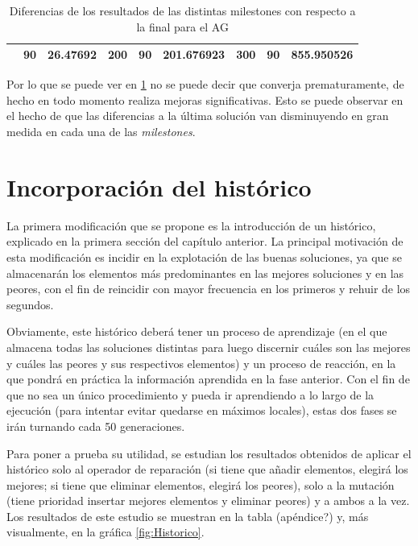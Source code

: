 \begin{table}[]
\begin{tabular}{|cclcclccl|}
\rowcolor[HTML]{DAE8FC} 
\multicolumn{1}{|c|}{\multirow{-13}{*}{\cellcolor[HTML]{FFFFC7}100}} & \multicolumn{1}{c|}{\cellcolor[HTML]{DAE8FC}90}        & \multicolumn{1}{l|}{\cellcolor[HTML]{DAE8FC}26.47692}   & \multicolumn{1}{c|}{\multirow{-13}{*}{\cellcolor[HTML]{FFFFC7}200}} & \multicolumn{1}{c|}{\cellcolor[HTML]{DAE8FC}90}        & \multicolumn{1}{l|}{\cellcolor[HTML]{DAE8FC}201.676923} & \multicolumn{1}{c|}{\multirow{-13}{*}{\cellcolor[HTML]{FFFFC7}300}} & \multicolumn{1}{c|}{\cellcolor[HTML]{DAE8FC}90}        & 855.950526 \\ \hline
\end{tabular}
\caption{\label{diferenciasAGEU}Diferencias de los resultados de las distintas milestones con respecto a la final para el AG}
\end{table}

Por lo que se puede ver en \ref{diferenciasAGEU} no se puede decir que converja prematuramente, de hecho en todo momento realiza mejoras significativas. 
Esto se puede observar en el hecho de que las diferencias a la última solución van disminuyendo en gran medida en cada una de las \textit{milestones}. 

\section{Incorporación del histórico}

La primera modificación que se propone es la introducción de un histórico, explicado en la primera sección del capítulo anterior. 
La principal motivación de esta modificación es incidir en la explotación de las buenas soluciones, ya que se almacenarán los elementos más predominantes en las mejores soluciones y en las peores, con el fin de reincidir con mayor frecuencia en los primeros y rehuir de los segundos. 

Obviamente, este histórico deberá tener un proceso de aprendizaje (en el que almacena todas las soluciones distintas para luego discernir cuáles son las mejores y cuáles las peores y sus respectivos elementos) y un proceso de reacción, en la que pondrá en práctica la información aprendida en la fase anterior. 
Con el fin de que no sea un único procedimiento y pueda ir aprendiendo a lo largo de la ejecución (para intentar evitar quedarse en máximos locales), estas dos fases se irán turnando cada 50 generaciones. 

Para poner a prueba su utilidad, se estudian los resultados obtenidos de aplicar el histórico solo al operador de reparación (si tiene que añadir elementos, elegirá los mejores; si tiene que eliminar elementos, elegirá los peores), solo a la mutación (tiene prioridad insertar mejores elementos y eliminar peores) y a ambos a la vez. 
Los resultados de este estudio se muestran en la tabla (apéndice?) y, más visualmente, en la gráfica \ref{fig:Historico}.

